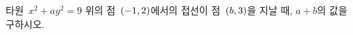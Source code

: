 타원~$x^2+ay^2=9$ 위의 점~$(-1{,}\mkern3mu\mathopen{}2)$에서의 접선이 점~$(b{,}\mkern3mu\mathopen{}3)$을 지날 때, $a+b$의 값을 구하시오. 
